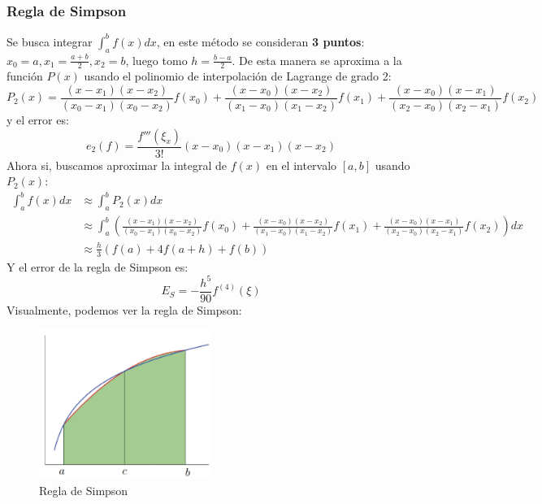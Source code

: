 \documentclass{article}
\begin{document}
\subsubsection{Regla de Simpson}
Se busca integrar $\int_{a}^{b} f(x) dx$, en este método se consideran \textbf{3 puntos}: $x_0=a, x_1=\frac{a+b}{2}, x_2=b$, luego tomo $h=\frac{b-a}{2}$. De esta manera se aproxima a la función $P(x)$ usando el polinomio de interpolación de Lagrange de grado 2:
\begin{equation}
    P_2(x) = \frac{(x-x_1)(x-x_2)}{(x_0-x_1)(x_0-x_2)}f(x_0) + \frac{(x-x_0)(x-x_2)}{(x_1-x_0)(x_1-x_2)}f(x_1) + \frac{(x-x_0)(x-x_1)}{(x_2-x_0)(x_2-x_1)}f(x_2)
\end{equation}
y el error es:
\begin{equation}
    e_2(f) = \frac{f'''(\xi_x)}{3!} (x-x_0)(x-x_1)(x-x_2)
\end{equation}
Ahora si, buscamos aproximar la integral de $f(x)$ en el intervalo $[a,b]$ usando $P_2(x)$:
\begin{align}
    \int_{a}^{b} f(x) dx &\approx \int_{a}^{b} P_2(x) dx \\
    &\approx \int_{a}^{b} \left( \frac{(x-x_1)(x-x_2)}{(x_0-x_1)(x_0-x_2)}f(x_0) + \frac{(x-x_0)(x-x_2)}{(x_1-x_0)(x_1-x_2)}f(x_1) + \frac{(x-x_0)(x-x_1)}{(x_2-x_0)(x_2-x_1)}f(x_2) \right) dx \\
    &\approx \frac{h}{3} (f(a) + 4f(a+h) + f(b))
\end{align}
Y el error de la regla de Simpson es:
\begin{equation}
    E_S = -\frac{h^5}{90} f^{(4)}(\xi)
\end{equation}
Visualmente, podemos ver la regla de Simpson:
\begin{figure}[h]
    \centering
    \includegraphics[width=0.5\textwidth]{images/simpson.png}
    \caption{Regla de Simpson}
    \label{fig:myplot18}
\end{figure}
\end{document}
